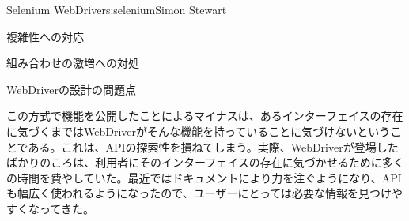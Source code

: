 \begin{aosachapter}{Selenium WebDriver}{s:selenium}{Simon Stewart}
\begin{aosasect1}{複雑性への対応}
\begin{aosasect2}{組み合わせの激増への対処}
\end{aosasect2}

\begin{aosasect2}{WebDriverの設計の問題点}

この方式で機能を公開したことによるマイナスは、あるインターフェイスの存在に気づくまではWebDriverがそんな機能を持っていることに気づけないということである。これは、APIの探索性を損ねてしまう。実際、WebDriverが登場したばかりのころは、利用者にそのインターフェイスの存在に気づかせるために多くの時間を費やしていた。最近ではドキュメントにより力を注ぐようになり、APIも幅広く使われるようになったので、ユーザーにとっては必要な情報を見つけやすくなってきた。


\end{aosasect2}
\end{aosasect1}
\end{aosachapter}
